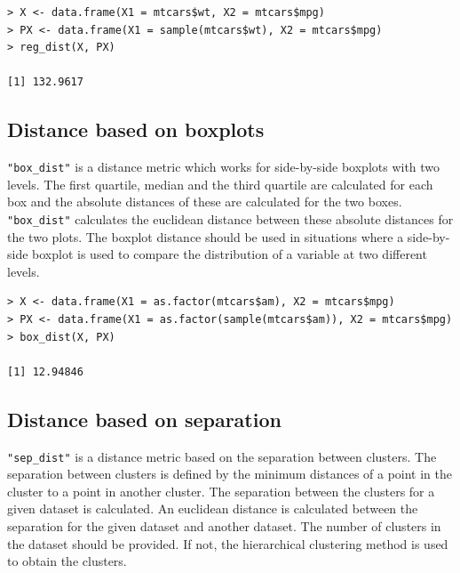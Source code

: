 \begin{verbatim}
> X <- data.frame(X1 = mtcars$wt, X2 = mtcars$mpg)
> PX <- data.frame(X1 = sample(mtcars$wt), X2 = mtcars$mpg)
> reg_dist(X, PX)

[1] 132.9617
\end{verbatim}

\subsection{Distance based on
boxplots}\label{distance-based-on-boxplots}

\texttt{"box\_dist"} is a distance metric which works for side-by-side
boxplots with two levels. The first quartile, median and the third
quartile are calculated for each box and the absolute distances of these
are calculated for the two boxes. \texttt{"box\_dist"} calculates the
euclidean distance between these absolute distances for the two plots.
The boxplot distance should be used in situations where a side-by-side
boxplot is used to compare the distribution of a variable at two
different levels.

%

\begin{verbatim}
> X <- data.frame(X1 = as.factor(mtcars$am), X2 = mtcars$mpg)
> PX <- data.frame(X1 = as.factor(sample(mtcars$am)), X2 = mtcars$mpg)
> box_dist(X, PX)

[1] 12.94846
\end{verbatim}

\subsection{Distance based on
separation}\label{distance-based-on-separation}

\texttt{"sep\_dist"} is a distance metric based on the separation
between clusters. The separation between clusters is defined by the
minimum distances of a point in the cluster to a point in another
cluster. The separation between the clusters for a given dataset is
calculated. An euclidean distance is calculated between the separation
for the given dataset and another dataset. The number of clusters in the
dataset should be provided. If not, the hierarchical clustering method
is used to obtain the clusters.

